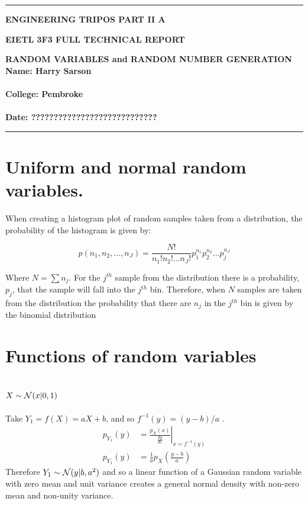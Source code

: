 \documentclass[12pt]{article}
\begin{document}
\noindent
\rule{15.7cm}{0.5mm}


\begin{center}
{\bf ENGINEERING TRIPOS PART II A}
\end{center}
\vspace{0.5cm} {\bf EIETL \hfill 3F3 FULL TECHNICAL REPORT}
\vspace{0.5cm}
\begin{center}
{\bf RANDOM VARIABLES and RANDOM NUMBER GENERATION\\
Name: Harry Sarson \\\hfill\\
College: Pembroke \\\hfill
\\
Date: ????????????????????????????	
}
\end{center}
\rule{15.7cm}{0.5mm}

\pagebreak

\section{Uniform and normal random variables.}

When creating a histogram plot of random samples taken from a distribution, the probability of the histogram is given by:

\begin{equation}
    p(n_1, n_2, \ldots, n_J) = \frac {N!} {n_1! n_2! \ldots n_J!} p_1^{n_1} p_2^{n_2} \ldots p_j^{n_J}
\end{equation}

Where $N = \sum n_j$. For the $j^{th}$ sample from the distribution there is a probability, $p_j$, that the sample will fall into the $j^{th}$ bin.
Therefore, when $N$ samples are taken from the distribution the probability that there are $n_j$ in the $j^{th}$ bin is given by the binomial distribution

\section{Functions of random variables}

\subsection{$X \sim {\cal N}(x|0,1)$}

Take ${Y_1} = f(X) = aX + b$, and so $f^{-1}(y) = (y - b) / a$ .
\begin{align}
p_{Y_1}(y) &= \left. \frac {p_X(x)} {\frac {dy} {dx}} \right|_{x = f^ {-1} (y)} \nonumber \\
p_{Y_1}(y) &= \frac 1 a  {p_X \left (\frac {y - b} a \right)}
\end{align}
Therefore $Y_1 \sim {\cal N}(y|b, a^2)$ and so a linear function of a Gaussian random variable with zero mean and unit variance creates a general normal density with non-zero mean and non-unity variance.
\end{document}
